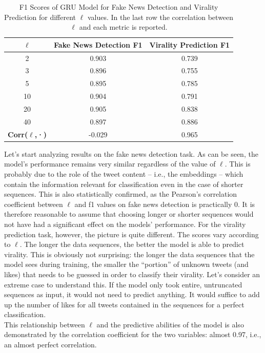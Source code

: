 \documentclass[a4paper,twoside,12pt]{book}
\begin{document}
\begin{table}[h!]
	\centering
	\caption{F1 Scores of GRU Model for Fake News Detection and Virality Prediction for different $\ell$ values. In the last row the correlation between $\ell$ and each metric is reported.}
	\begin{tabular}{c|c|c}
		\hline
		\textbf{$\ell$} & \textbf{Fake News Detection F1} & \textbf{Virality Prediction F1} \\
		\hline
		2  & 0.903 & 0.739 \\
		3  & 0.896 & 0.755 \\
		5  & 0.895 & 0.785 \\
		10 & 0.904 & 0.791 \\
		20 & 0.905 & 0.838 \\
		40 & 0.897 & 0.886 \\
		\hline
		\textbf{Corr($\ell$,·)} & -0.029 & {0.965} \\
		\hline
	\end{tabular}
\end{table}
\vspace{1em}

Let's start analyzing results on the fake news detection task. As can be seen, the model's performance remains very similar regardless of the value of $\ell$. This is probably due to the role of the tweet content -- i.e., the embeddings -- which contain the information relevant for classification even in the case of shorter sequences. This is also statistically confirmed, as the Pearson's correlation coefficient between $\ell$ and f1 values on fake news detection is practically 0. It is therefore reasonable to assume that choosing longer or shorter sequences would not have had a significant effect on the models' performance. For the virality prediction task, however, the picture is quite different. The scores vary according to $\ell$. The longer the data sequences, the better the model is able to predict virality. This is obviously not surprising: the longer the data sequences that the model sees during training, the smaller the “portion” of unknown tweets (and likes) that needs to be guessed in order to classify their virality. Let's consider an extreme case to understand this. If the model only took entire, untruncated sequences as input, it would not need to predict anything. It would suffice to add up the number of likes for all tweets contained in the sequences for a perfect classification.\\
This relationship between $\ell$ and the predictive abilities of the model is also demonstrated by the correlation coefficient for the two variables: almost 0.97, i.e., an almost perfect correlation.\\
\end{document}
